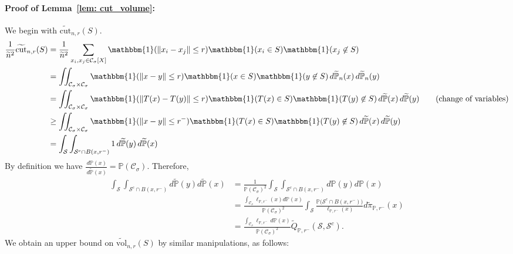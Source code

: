 \documentclass[11pt,twoside]{article}
\newcommand{\vol}{\mathrm{vol}}
\newcommand{\cut}{\mathrm{cut}}
\newcommand{\norm}[1]{\left\lVert#1\right\rVert}
\newcommand{\1}{\mathbbm{1}}
\newcommand{\Xbf}{X}
\newcommand{\Pbb}{\mathbb{P}}
\newcommand{\Sset}{\mathcal{S}}
\newcommand{\Cset}{\mathcal{C}}
\newcommand{\Csig}{\Cset_{\sigma}}
\newcommand{\piwt}{\widetilde{\pi}}
\begin{document}
\paragraph{Proof of Lemma~\ref{lem: cut_volume}: }

We begin with $\widetilde{\cut}_{n,r}(S)$.
\begin{align*}
\frac{1}{\widetilde{n}^2} \widetilde{\cut}_{n,r}(S) & = \frac{1}{ \widetilde{n}^2} \sum_{x_i, x_j \in \Csig[\Xbf]} \1(\norm{x_i - x_j} \leq r) \1(x_i \in S) \1(x_j \not\in S)\\
& = \iint_{\Csig \times \Csig} \1(\norm{x - y} \leq r) \1(x \in S) \1(y \not\in S) \,d\widetilde{\Pbb}_n(x) \,d\widetilde{\Pbb}_n(y) \\
& =  \iint_{\Csig \times \Csig} \1(\norm{T(x) - T(y)} \leq r) \1(T(x) \in S) \1(T(y) \not\in S)\,d\widetilde{\Pbb}(x) \,d\widetilde{\Pbb}(y) \tag{change of variables}  \\
& \geq \iint_{\Csig \times \Csig} \1(\norm{x - y} \leq r^-) \1(T(x) \in S) \1(T(y) \not\in S) \,d\widetilde{\Pbb}(x) \,d\widetilde{\Pbb}(y) \\
& = \int_{\Sset} \int_{\Sset^c \cap B(x,r^-)} 1 \,d\widetilde{\Pbb}(y) \,d\widetilde{\Pbb}(x)
\end{align*}
By definition we have $\frac{\,d\Pbb(x)}{\,d\widetilde{\Pbb}(x)} = \Pbb(\Csig)$. Therefore,
\begin{align}
\int_{\Sset} \int_{\Sset^c \cap B(x,r^-)} d\widetilde{\Pbb}(y) d\widetilde{\Pbb}(x) & = \frac{1}{\Pbb(\Csig)^2} \int_{\Sset} \int_{\Sset^c \cap B(x,r^-)} d\Pbb(y) d\Pbb(x) \nonumber \\
& = \frac{\int_{\Csig} \ell_{\Pbb,r^-}(x) d\Pbb(x)}{\Pbb(\Csig)^2} \int_{\Sset} \frac{\Pbb\bigl(\Sset^c \cap B(x,r^-)\bigr)}{\ell_{\Pbb,r^-}(x)} d\piwt_{\Pbb,r^-}(x) \nonumber \\
& = \frac{\int_{\Csig} \ell_{\Pbb,r^-}\,d\Pbb(x)}{\Pbb(\Csig)^2} \widetilde{Q}_{\Pbb,r^-}(\Sset, \Sset^c). \label{eqn: cut_bound}
\end{align}	
We obtain an upper bound on $\widetilde{\vol}_{n,r}(S)$ by similar manipulations, as follows:
\end{document}
